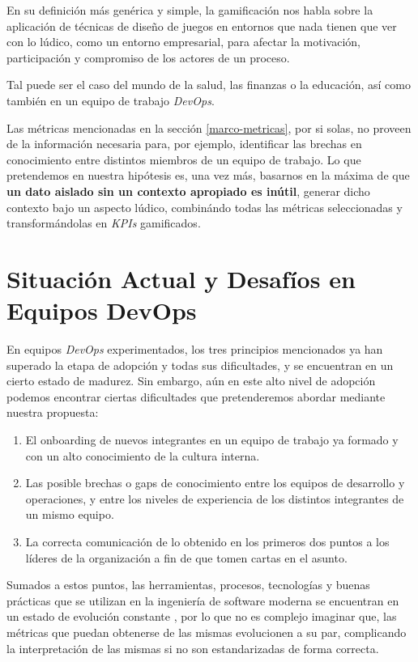 \documentclass[journal]{IEEEtran}
\begin{document}
En su definición más genérica y simple, la gamificación nos habla sobre la aplicación de técnicas de diseño de juegos en entornos que nada tienen que ver con lo lúdico, como un entorno empresarial, para afectar la motivación, participación y compromiso de los actores de un proceso.

Tal puede ser el caso del mundo de la salud, las finanzas o la educación, así como también en un equipo de trabajo \textit{DevOps}.

Las métricas mencionadas en la sección \ref{marco-metricas}, por si solas, no proveen de la información necesaria para, por ejemplo, identificar las brechas en conocimiento entre distintos miembros de un equipo de trabajo. Lo que pretendemos en nuestra hipótesis es, una vez más, basarnos en la máxima de que \textbf{un dato aislado sin un contexto apropiado es inútil}, generar dicho contexto bajo un aspecto lúdico, combinándo todas las métricas seleccionadas y transformándolas en \textit{KPIs} gamificados. 

\section{\textbf{\Large Situación Actual y Desafíos en Equipos DevOps}}

En equipos \textit{DevOps} experimentados, los tres principios mencionados ya han superado la etapa de adopción y todas sus dificultades, y se encuentran en un cierto estado de madurez. Sin embargo, aún en este alto nivel de adopción podemos encontrar ciertas dificultades que pretenderemos abordar mediante nuestra propuesta:

\begin{enumerate}
    \item El onboarding de nuevos integrantes en un equipo de trabajo ya formado y con un alto conocimiento de la cultura interna.
    \item Las posible brechas o gaps de conocimiento entre los equipos de desarrollo y operaciones, y entre los niveles de experiencia de los distintos integrantes de un mismo equipo.
    \item La correcta comunicación de lo obtenido en los primeros dos puntos a los líderes de la organización a fin de que tomen cartas en el asunto.
\end{enumerate}

Sumados a estos puntos, las herramientas, procesos, tecnologías y buenas prácticas que se utilizan en la ingeniería de software moderna se encuentran en un estado de evolución constante \cite{ayoup2022achievement}, por lo que no es complejo imaginar que, las métricas que puedan obtenerse de las mismas evolucionen a su par, complicando la interpretación de las mismas si no son estandarizadas de forma correcta.
\end{document}
